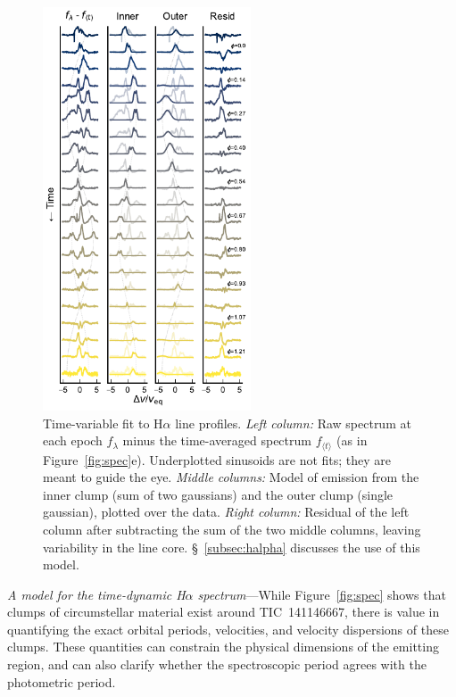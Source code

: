 \documentclass{nature3}
\begin{document}
\begin{methods}
\begin{figure}[!tp]
  \centering
  \includegraphics[width=0.55\textwidth]{figures/sf6.pdf}
  \caption{Time-variable fit to H$\alpha$ line profiles.
  {\it Left column:} Raw spectrum at each epoch $f_{\lambda}$ minus
  the time-averaged spectrum $f_{\langle t \rangle}$ (as in
  Figure~\ref{fig:spec}e).
  Underplotted sinusoids are not fits; they are meant to guide the eye.
  {\it Middle columns:} Model of emission from the inner clump (sum of
  two gaussians) and the outer clump (single gaussian), plotted over
  the data.
  {\it Right column:} Residual of the left column after subtracting
  the sum of the two middle columns, leaving variability in the line
  core.  
  \S~\ref{subsec:halpha} discusses the use of this model.
  }
  \label{fig:halphamodel}
\end{figure}

{\it A model for the time-dynamic H$\alpha$ spectrum}---While
Figure~\ref{fig:spec} shows that clumps of circumstellar material
exist around TIC~141146667, there is value in quantifying the exact
orbital periods, velocities, and velocity dispersions of these clumps.
These quantities can constrain the physical dimensions of the emitting
region, and can also clarify whether the spectroscopic period agrees
with the photometric period.


\end{methods}
\end{document}
